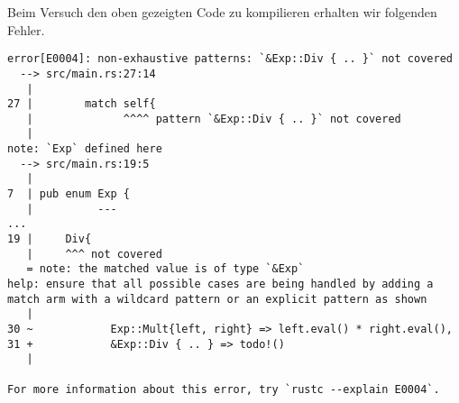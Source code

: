 \documentclass[a4paper, 1ppt]{article}
\begin{document}
Beim Versuch den oben gezeigten Code zu kompilieren erhalten wir folgenden Fehler.
\begin{verbatim}
error[E0004]: non-exhaustive patterns: `&Exp::Div { .. }` not covered
  --> src/main.rs:27:14
   |
27 |        match self{
   |              ^^^^ pattern `&Exp::Div { .. }` not covered
   |
note: `Exp` defined here
  --> src/main.rs:19:5
   |
7  | pub enum Exp {
   |          ---
...
19 |     Div{
   |     ^^^ not covered
   = note: the matched value is of type `&Exp`
help: ensure that all possible cases are being handled by adding a match arm with a wildcard pattern or an explicit pattern as shown
   |
30 ~            Exp::Mult{left, right} => left.eval() * right.eval(),
31 +            &Exp::Div { .. } => todo!()
   |

For more information about this error, try `rustc --explain E0004`.
\end{verbatim}
\end{document}
